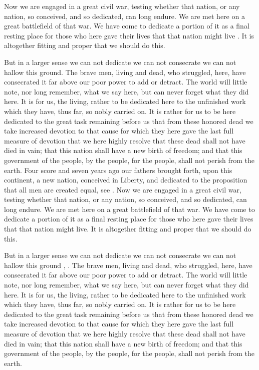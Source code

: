 \documentclass{roffin}
\begin{document}
Now we are engaged in a great civil war, testing whether that nation, or any nation, so conceived, and so dedicated, can long endure.
We are met here on a great battlefield of that war. We have come to dedicate a portion of it as a final resting place for those who
here gave their lives that that nation might live \cite*{Arabie80}. It is altogether fitting and proper that we should do this.

But in a larger sense we can not dedicate we can not consecrate we can not hallow this ground. The brave men, living and dead,
who struggled, here, have consecrated it far above our poor power to add or detract. The world will little note, nor long remember,
what we say here, but can never forget what they did here. It is for us, the living, rather to be dedicated here to the unfinished work
which they have, thus far, so nobly carried on. It is rather for us to be here dedicated to the great task remaining before us that
from these honored dead we take increased devotion to that cause for which they here gave the last full measure of devotion that
we here highly resolve that these dead shall not have died in vain; that this nation shall have a new birth of freedom; and that this
government of the people, by the people, for the people, shall not perish from the earth.
Four score and seven years ago our fathers brought forth,
upon this continent, a new nation, conceived in Liberty, and dedicated to
the proposition that all men are created equal, see \cite{Ball65}.
Now we are engaged in a great civil war, testing whether that nation, or any nation, so conceived, and so dedicated, can long endure.
We are met here on a great battlefield of that war. We have come to dedicate a portion of it as a final resting place for those who
here gave their lives that that nation might live. It is altogether fitting and proper that we should do this.


But in a larger sense we can not dedicate we can not consecrate we
can not hallow this ground  \cite{Banfield93}, \cite{Bezdek74}. The brave men, living and dead,
who struggled, here, have consecrated it far above our poor power to add or detract. The world will little note, nor long remember,
what we say here, but can never forget what they did here. It is for us, the living, rather to be dedicated here to the unfinished work
which they have, thus far, so nobly carried on. It is rather for us to be here dedicated to the great task remaining before us that
from these honored dead we take increased devotion to that cause for which they here gave the last full measure of devotion that
we here highly resolve that these dead shall not have died in vain; that this nation shall have a new birth of freedom; and that this
government of the people, by the people, for the people, shall not perish from the earth.
\end{document}
